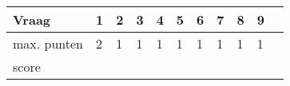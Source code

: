 \begin{table}[!b]
\centering
\begin{tabular}{|l|l|l|l|l|l|l|l|l|l|l|}
\hline
Vraag       & 1 & 2 & 3 & 4 & 5 & 6 & 7 & 8 & 9 \\ \hline
max. punten & 2 & 1 & 1 & 1 & 1 & 1 & 1 & 1 & 1 \\ \hline
score       &   &   &   &   &   &   &   &   &   \\ \hline
\end{tabular}
\end{table}